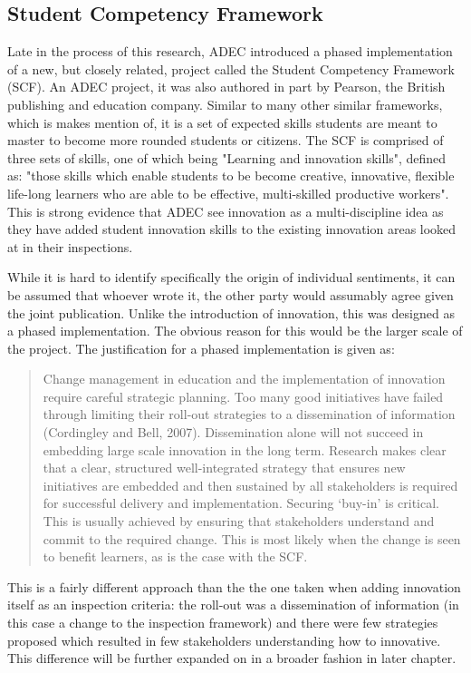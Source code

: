 \subsection{Student Competency Framework}

Late in the process of this research, ADEC introduced a phased implementation of a new, but closely related, project called the Student Competency Framework (SCF). An ADEC project, it was also authored in part by Pearson, the British publishing and education company. Similar to many other similar frameworks, which is makes mention of, it is a set of expected skills students are meant to master to become more rounded students or citizens. The SCF is comprised of three sets of skills, one of which being "Learning and innovation skills", defined as: "those skills which enable students to be become creative, innovative, flexible life-long learners who are able to be effective, multi-skilled productive workers". This is strong evidence that ADEC see innovation as a multi-discipline idea as they have added student innovation skills to the existing innovation areas looked at in their inspections.

While it is hard to identify specifically the origin of individual sentiments, it can be assumed that whoever wrote it, the other party would assumably agree given the joint publication. Unlike the introduction of innovation, this was designed as a phased implementation. The obvious reason for this would be the larger scale of the project. The justification for a phased implementation is given as:

\begin{quote}
Change management in education and the implementation of innovation require careful strategic planning. Too many good initiatives have failed through limiting their roll-out strategies to a dissemination of information (Cordingley and Bell, 2007). Dissemination alone will not succeed in embedding large scale innovation in the long term. Research makes clear that a clear, structured well-integrated strategy that ensures new initiatives are embedded and then sustained by all stakeholders is required for successful delivery and implementation. Securing ‘buy-in’ is critical. This is usually achieved by ensuring that stakeholders understand and commit to the required change. This is most likely when the change is seen to benefit learners, as is the case with the SCF.
\end{quote}

This is a fairly different approach than the the one taken when adding innovation itself as an inspection criteria: the roll-out was a dissemination of information (in this case a change to the inspection framework) and there were few strategies proposed which resulted in few stakeholders understanding how to innovative. This difference will be further expanded on in a broader fashion in later chapter.

